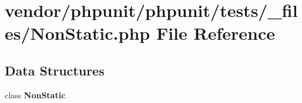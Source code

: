 \section{vendor/phpunit/phpunit/tests/\+\_\+files/\+Non\+Static.php File Reference}
\label{_non_static_8php}
\subsection*{Data Structures}
\begin{DoxyCompactItemize}
\item 
class {\bf Non\+Static}
\end{DoxyCompactItemize}
